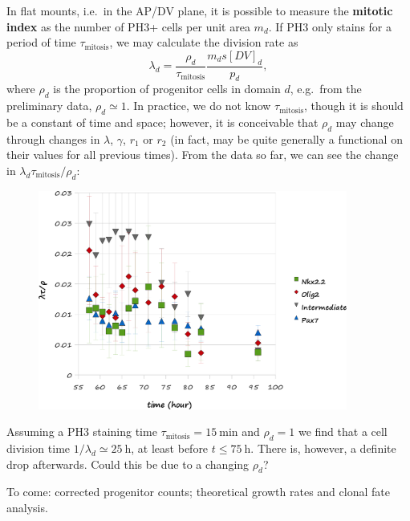 \documentclass[10pt,english]{article}
\begin{document}
In flat mounts, i.e.\ in the AP/DV plane, it is possible to measure the \textbf{mitotic index} as the number of PH3+ cells per unit area $m_d$. If PH3 only stains for a period of time $\tau_\textrm{mitosis}$, we may calculate the division rate as $$\lambda_d = \frac{\rho_d}{\tau_\textrm{mitosis}}\frac{m_d s [DV]_d}{p_d},$$ where $\rho_d$ is the proportion of progenitor cells in domain $d$, e.g.\ from the preliminary data, $\rho_d \simeq 1$. In practice, we do not know $\tau_\textrm{mitosis}$, though it is should be a constant of time and space; however, it is conceivable that $\rho_d$ may change through changes in $\lambda$, $\gamma$, $r_1$ or $r_2$ (in fact, may be quite generally a functional on their values for all previous times). From the data so far, we can see the change in $\lambda_d \tau_\textrm{mitosis} / \rho_d$:

\begin{figure}[h]
	\begin{center}
		\includegraphics[width=4in]{consistency-mitotic-index.png}
	\end{center}
\end{figure}


Assuming a PH3 staining time $\tau_\textrm{mitosis} = \SI{15}{\minute}$ and $\rho_d = 1$ we find that a cell division time $1/\lambda_d \simeq \SI{25}{\hour}$, at least before $t \le \SI{75}{\hour}$. There is, however, a definite drop afterwards. Could this be due to a changing $\rho_d$?

To come: corrected progenitor counts; theoretical growth rates and clonal fate analysis.
\end{document}
